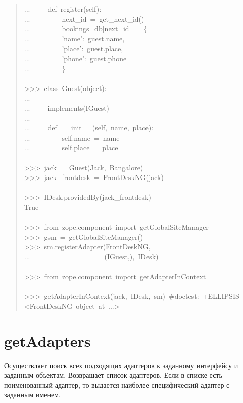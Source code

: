 \documentclass[a4paper,openany,twoside,final]{book}
\begin{document}
\begin{quote}
{...~~~~~def~register(self):\\
...~~~~~~~~~next\_id~=~get\_next\_id()\\
...~~~~~~~~~bookings\_db{[}next\_id{]}~=~\{\\
...~~~~~~~~~'name':~guest.name,\\
...~~~~~~~~~'place':~guest.place,\\
...~~~~~~~~~'phone':~guest.phone\\
...~~~~~~~~~\}\\
~\\
>{}>{}>~class~Guest(object):\\
...\\
...~~~~~implements(IGuest)\\
...\\
...~~~~~def~\_\_init\_\_(self,~name,~place):\\
...~~~~~~~~~self.name~=~name\\
...~~~~~~~~~self.place~=~place\\
~\\
>{}>{}>~jack~=~Guest(\textquotedbl{}Jack\textquotedbl{},~\textquotedbl{}Bangalore\textquotedbl{})\\
>{}>{}>~jack\_frontdesk~=~FrontDeskNG(jack)\\
~\\
>{}>{}>~IDesk.providedBy(jack\_frontdesk)\\
True\\
~\\
>{}>{}>~from~zope.component~import~getGlobalSiteManager\\
>{}>{}>~gsm~=~getGlobalSiteManager()\\
>{}>{}>~sm.registerAdapter(FrontDeskNG,\\
...~~~~~~~~~~~~~~~~~~~~~(IGuest,),~IDesk)\\
~\\
>{}>{}>~from~zope.component~import~getAdapterInContext\\
~\\
>{}>{}>~getAdapterInContext(jack,~IDesk,~sm)~\#doctest:~+ELLIPSIS\\
<FrontDeskNG~object~at~...>
}
\end{quote}


\section*{getAdapters%
  \label{getadapters}%
}

Осуществляет поиск всех подходящих адаптеров к заданному интерфейсу и
заданным объектам.  Возвращает список адаптеров.  Если в списке есть
поименованный адаптер, то выдается наиболее специфический адаптер с
заданным именем.
\end{document}
